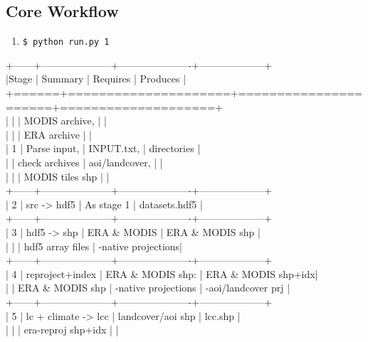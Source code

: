 \documentclass[twoside,a4paper]{refart}
\begin{document}
\subsection{Core Workflow}
\begin{enumerate}[1)]
\item
\texttt{\$ python run.py 1}
\end{enumerate}
 +------+---------------------+----------------------+--------------------+\\
    |Stage | Summary             | Requires             | Produces           |\\
    +======+=====================+======================+====================+\\
    |      |                     | MODIS archive,       |                    |\\
    |      |                     | ERA archive          |                    |\\
    | 1    | Parse input,        | INPUT.txt,           | directories        |\\
    |      | check archives      | aoi/landcover,       |                    |\\
    |      |                     | MODIS tiles shp      |                    |\\
    +------+---------------------+----------------------+--------------------+\\
    | 2    | src -> hdf5         | As stage 1           | datasets.hdf5      |\\
    +------+---------------------+----------------------+--------------------+\\
    | 3    | hdf5 -> shp         | ERA \& MODIS          | ERA \& MODIS shp    |\\
    |      |                     | hdf5 array files     | -native projections|\\
    +------+---------------------+----------------------+--------------------+\\
    | 4    | reproject+index     | ERA \& MODIS shp:     | ERA \& MODIS shp+idx|\\
    |      | ERA \& MODIS shp     | -native projections  | -aoi/landcover prj |\\
    +------+---------------------+----------------------+--------------------+\\
    | 5    | lc + climate -> lcc | landcover/aoi shp    | lcc.shp            |\\
    |      |                     | era-reproj shp+idx   |                    |\\
\end{document}
